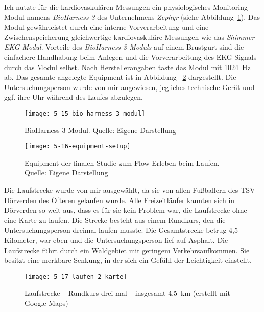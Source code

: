 Ich nutzte für die kardiovaskulären Messungen ein physiologisches Monitoring Modul namens \emph{BioHarness 3} des Unternehmens \emph{Zephyr} (siehe Abbildung~\ref{fig:5_15_bio_harness_3_modul}). Das Modul gewährleistet durch eine interne Vorverarbeitung und eine Zwischenspeicherung gleichwertige kardiovaskuläre Messungen wie das \emph{Shimmer EKG-Modul}. Vorteile des \emph{BioHarness 3 Moduls} auf einem Brustgurt sind die einfachere Handhabung beim Anlegen und die Vorverarbeitung des \ac{EKG}-Signals durch das Modul selbst. Nach Herstellerangaben taste das Modul mit 1024~Hz ab. Das gesamte angelegte Equipment ist in Abbildung ~\ref{fig:5_16_equipment_setup} dargestellt. Die Untersuchungsperson wurde von mir angewiesen, jegliches technische Gerät und ggf. ihre Uhr während des Laufes abzulegen.

\begin{figure}[t]
	\centering
		\texttt{[image: 5-15-bio-harness-3-modul]}
	\caption[BioHarness 3 Modul]{BioHarness 3 Modul. Quelle: Eigene Darstellung}
	\label{fig:5_15_bio_harness_3_modul}
\end{figure}

\begin{figure}[t]
	\centering
		\texttt{[image: 5-16-equipment-setup]}
	\caption[Equipment der finalen Studie zum Flow-Erleben beim Laufen]{Equipment der finalen Studie zum Flow-Erleben beim Laufen. Quelle: Eigene Darstellung}
	\label{fig:5_16_equipment_setup}
\end{figure}

Die Laufstrecke wurde von mir ausgewählt, da sie von allen Fußballern des TSV Dörverden des Öfteren gelaufen wurde. Alle Freizeitläufer kannten sich in Dörverden so weit aus, dass es für sie kein Problem war, die Laufstrecke ohne eine Karte zu laufen. Die Strecke besteht aus einem Rundkurs, den die Untersuchungsperson dreimal laufen musste. Die Gesamtstrecke betrug 4,5 Kilometer, war eben und die Untersuchungsperson lief auf Asphalt. Die Laufstrecke führt durch ein Waldgebiet mit geringem Verkehrsaufkommen. Sie besitzt eine merkbare Senkung, in der sich ein Gefühl der Leichtigkeit einstellt. 

\begin{figure}[t]
	\centering
		\texttt{[image: 5-17-laufen-2-karte]}
	\caption[Laufstrecke -- Rundkurs]{Laufstrecke -- Rundkurs drei mal -- insgesamt 4,5~km (erstellt mit Google Maps)}
	\label{fig:5_17_laufen_2_karte}
\end{figure}


